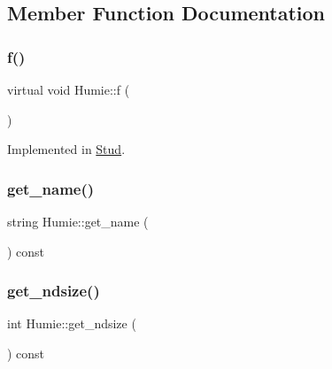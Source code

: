 \subsection{Member Function Documentation}
\mbox{\label{class_humie_a1bfe9cf46655ca5952b83c1652d8c0a1}} 
\subsubsection{\texorpdfstring{f()}{f()}}
{\footnotesize\ttfamily virtual void Humie\+::f (\begin{DoxyParamCaption}{ }\end{DoxyParamCaption})\hspace{0.3cm}{\ttfamily [pure virtual]}}



Implemented in \mbox{\hyperlink{class_stud_a6ebf0056208a353346da33a779763e4f}{Stud}}.

\mbox{\label{class_humie_ac2878f4f3c6d4c9450e286401d96d50c}} 
\subsubsection{\texorpdfstring{get\_name()}{get\_name()}}
{\footnotesize\ttfamily string Humie\+::get\+\_\+name (\begin{DoxyParamCaption}{ }\end{DoxyParamCaption}) const\hspace{0.3cm}{\ttfamily [inline]}}

\mbox{\label{class_humie_a403431ff800cd4855abd484061a2aa85}} 
\subsubsection{\texorpdfstring{get\_ndsize()}{get\_ndsize()}}
{\footnotesize\ttfamily int Humie\+::get\+\_\+ndsize (\begin{DoxyParamCaption}{ }\end{DoxyParamCaption}) const\hspace{0.3cm}{\ttfamily [inline]}}

\mbox{\label{class_humie_a984520f9906583e9daf46c4d6ea21712}} 
